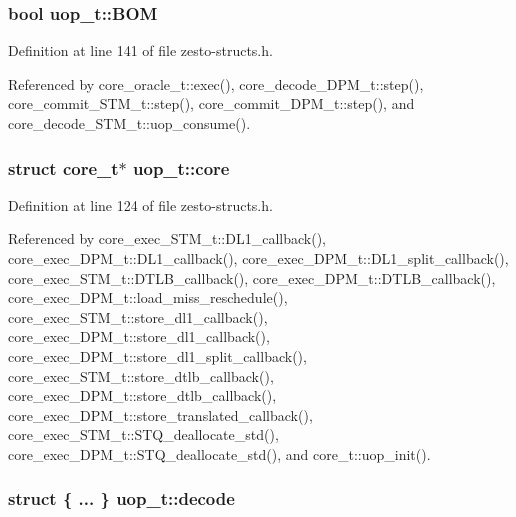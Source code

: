 \subsubsection[{BOM}]{\setlength{\rightskip}{0pt plus 5cm}bool {\bf uop\_\-t::BOM}}\label{structuop__t_075d4a905368cc1eeb377d2a41bd9c20}




Definition at line 141 of file zesto-structs.h.

Referenced by core\_\-oracle\_\-t::exec(), core\_\-decode\_\-DPM\_\-t::step(), core\_\-commit\_\-STM\_\-t::step(), core\_\-commit\_\-DPM\_\-t::step(), and core\_\-decode\_\-STM\_\-t::uop\_\-consume().
\subsubsection[{core}]{\setlength{\rightskip}{0pt plus 5cm}struct {\bf core\_\-t}$\ast$ {\bf uop\_\-t::core}\hspace{0.3cm}{\tt  [read]}}\label{structuop__t_0f98fc5d2776745a7543b190c454143b}




Definition at line 124 of file zesto-structs.h.

Referenced by core\_\-exec\_\-STM\_\-t::DL1\_\-callback(), core\_\-exec\_\-DPM\_\-t::DL1\_\-callback(), core\_\-exec\_\-DPM\_\-t::DL1\_\-split\_\-callback(), core\_\-exec\_\-STM\_\-t::DTLB\_\-callback(), core\_\-exec\_\-DPM\_\-t::DTLB\_\-callback(), core\_\-exec\_\-DPM\_\-t::load\_\-miss\_\-reschedule(), core\_\-exec\_\-STM\_\-t::store\_\-dl1\_\-callback(), core\_\-exec\_\-DPM\_\-t::store\_\-dl1\_\-callback(), core\_\-exec\_\-DPM\_\-t::store\_\-dl1\_\-split\_\-callback(), core\_\-exec\_\-STM\_\-t::store\_\-dtlb\_\-callback(), core\_\-exec\_\-DPM\_\-t::store\_\-dtlb\_\-callback(), core\_\-exec\_\-DPM\_\-t::store\_\-translated\_\-callback(), core\_\-exec\_\-STM\_\-t::STQ\_\-deallocate\_\-std(), core\_\-exec\_\-DPM\_\-t::STQ\_\-deallocate\_\-std(), and core\_\-t::uop\_\-init().
\subsubsection[{decode}]{\setlength{\rightskip}{0pt plus 5cm}struct \{ ... \}   {\bf uop\_\-t::decode}}\label{structuop__t_c42cc8544fd53bb8513c3aabef62c13b}




